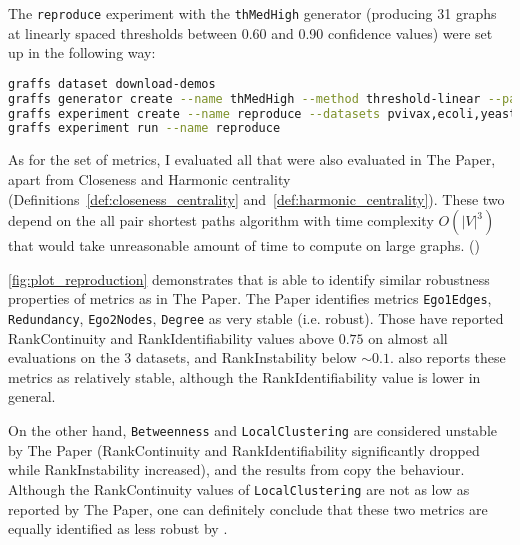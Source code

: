 The \texttt{reproduce} experiment with the \texttt{thMedHigh} generator (producing 31 graphs at linearly spaced thresholds between 0.60 and 0.90 confidence values) were set up in the following way:
\begin{lstlisting}[language=bash]
graffs dataset download-demos
graffs generator create --name thMedHigh --method threshold-linear --params 600,900 -n 31 --seed 7
graffs experiment create --name reproduce --datasets pvivax,ecoli,yeast --generator thMedHigh --metrics Betweenness,Degree,Ego1Edges,Ego2Nodes,LocalClustering,PageRank,Redundancy --robustnessMeasures RankIdentifiability,RankInstability,RankContinuity
graffs experiment run --name reproduce
\end{lstlisting}

As for the set of metrics, I evaluated all that were also evaluated in The Paper, apart from Closeness and Harmonic centrality (Definitions~\ref{def:closeness_centrality} and~\ref{def:harmonic_centrality}).
These two depend on the all pair shortest paths algorithm with time complexity $O({\left\lvert V \right\rvert}^3)$ that would take unreasonable amount of time to compute on large graphs. ()



\autoref{fig:plot_reproduction} demonstrates that \graffs is able to identify similar robustness properties of metrics as in The Paper.
The Paper identifies metrics \texttt{Ego1Edges}, \texttt{Redundancy}, \texttt{Ego2Nodes}, \texttt{Degree} as very stable (i.e. robust).
Those have reported RankContinuity and RankIdentifiability values above $0.75$ on almost all evaluations on the 3 datasets, and RankInstability below $\sim 0.1$.
\graffs also reports these metrics as relatively stable, although the RankIdentifiability value is lower in general.

On the other hand, \texttt{Betweenness} and \texttt{LocalClustering} are considered unstable by The Paper (RankContinuity and RankIdentifiability significantly dropped while RankInstability increased), and the results from \graffs copy the behaviour.
Although the RankContinuity values of \texttt{LocalClustering} are not as low as reported by The Paper, one can definitely conclude that these two metrics are equally identified as less robust by \graffs.

